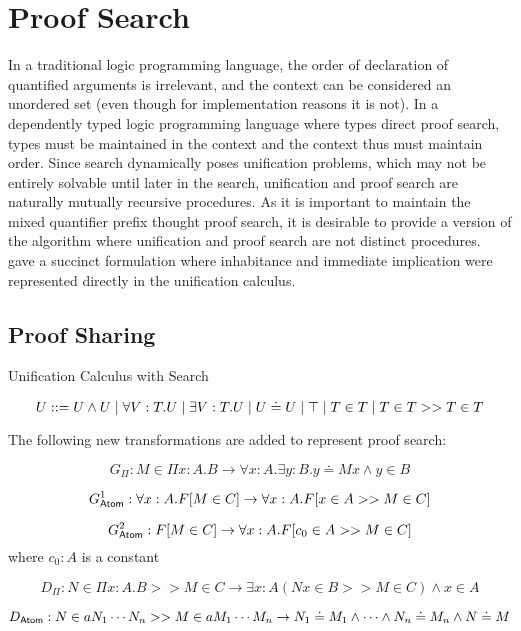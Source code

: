 \section{Proof Search}

In a traditional logic programming language, the order of declaration of quantified arguments is irrelevant, 
and the context can be considered an unordered set (even though for implementation reasons it is not). 
In a dependently typed logic programming language where types direct proof search, types must be maintained in the context
and the context thus must maintain order.   Since search dynamically poses unification problems, which may not be 
entirely solvable until later in the search, unification and proof search are naturally mutually recursive procedures.
As it is important to maintain the mixed quantifier prefix thought proof search, it is desirable to provide a version 
of the algorithm where unification and proof search are not distinct procedures. 
\citep{pfenning1991logic} gave a succinct formulation where inhabitance and immediate implication were represented
directly in the unification calculus.  

\subsection{Proof Sharing}

\begin{definition}
Unification Calculus with Search

\[
U ::= U \wedge U 
 \; | \; \forall V : T . U
 \; | \; \exists V : T . U 
 \; | \; U \doteq U
 \; | \; \top
  \; | \; T \in T 
  \; | \; T \in T >> T \in T
\]

\end{definition}

The following new transformations are added to represent proof search:

\[
G_\Pi : M \in \Pi x : A . B   \rightarrow \forall x : A . \exists y : B . y \doteq M x \wedge y \in B
\]

\[
G^1_{\mathsf{Atom}} : \forall x : A . F[M\in C]  \rightarrow \forall x : A . F[x \in A >> M \in C]
\]

\[
G^2_{\mathsf{Atom}} : F[M\in C]  \rightarrow \forall x : A . F[c_0 \in A >> M \in C]
\]  where $c_0 : A$ is a constant

\[
D_\Pi : N\in \Pi x : A . B >> M \in C \rightarrow \exists x : A ( N x \in B >> M \in C) \wedge x \in A
\]

\[
D_{\mathsf{Atom}} : N\in a N_1 \cdots N_n >> M \in a M_1 \cdots M_n \rightarrow N_1 \doteq M_1 \wedge \cdots \wedge N_n \doteq M_n \wedge N \doteq M
\]

